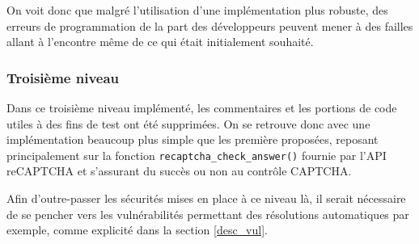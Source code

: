 On voit donc que malgré l'utilisation d'une implémentation plus robuste, des erreurs de programmation de la part des développeurs peuvent mener à des failles allant à l'encontre même de ce qui était initialement souhaité. 

\subsubsection{Troisième niveau}

Dans ce troisième niveau implémenté, les commentaires et les portions de code utiles à des fins de test ont été supprimées. On se retrouve donc avec une implémentation beaucoup plus simple que les première proposées, reposant principalement sur la fonction \texttt{recaptcha\_check\_answer()} fournie par l'API reCAPTCHA et s'assurant du succès ou non au contrôle CAPTCHA.

Afin d'outre-passer les sécurités mises en place à ce niveau là, il serait nécessaire de se pencher vers les vulnérabilités permettant des résolutions automatiques par exemple, comme explicité dans la section \ref{desc_vul}.






\clearpage